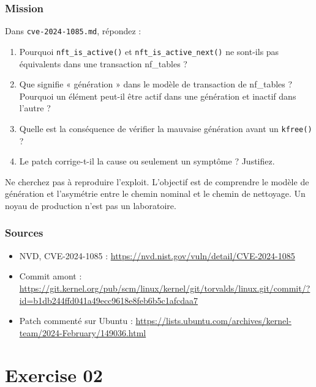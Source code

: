 \documentclass{training}
\begin{document}
\subsection*{Mission}

Dans \texttt{cve-2024-1085.md}, répondez :

\begin{enumerate}
  \item Pourquoi \texttt{nft\_is\_active()} et
        \texttt{nft\_is\_active\_next()} ne sont-ils pas équivalents dans une
        transaction nf\_tables ?
  \item Que signifie « génération » dans le modèle de transaction de
        nf\_tables ? Pourquoi un élément peut-il être actif dans une
        génération et inactif dans l'autre ?
  \item Quelle est la conséquence de vérifier la mauvaise génération avant
        un \texttt{kfree()} ?
  \item Le patch corrige-t-il la cause ou seulement un symptôme ? Justifiez.
\end{enumerate}

\begin{warn}
Ne cherchez pas à reproduire l'exploit. L'objectif est de comprendre le
modèle de génération et l'asymétrie entre le chemin nominal et le chemin de
nettoyage. Un noyau de production n'est pas un laboratoire.
\end{warn}

\subsection*{Sources}
\begin{itemize}
  \item NVD, CVE-2024-1085 :
        \url{https://nvd.nist.gov/vuln/detail/CVE-2024-1085}
  \item Commit amont :
        \url{https://git.kernel.org/pub/scm/linux/kernel/git/torvalds/linux.git/commit/?id=b1db244ffd041a49ecc9618e8feb6b5c1afcdaa7}
  \item Patch commenté sur Ubuntu :
        \url{https://lists.ubuntu.com/archives/kernel-team/2024-February/149036.html}
\end{itemize}

\chapter{Exercise 02}
\makeheaderfiles
\end{document}
